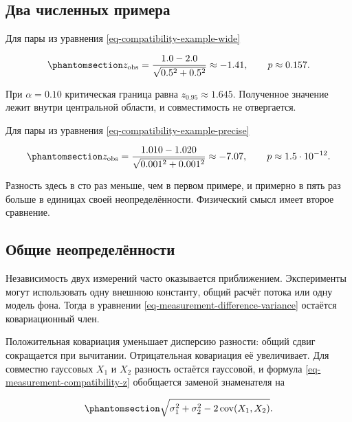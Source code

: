 \documentclass[
  russian,
  11pt,
  a4paper,
  open=any]{scrbook}
\begin{document}
\subsection{Два численных
примера}\label{ux434ux432ux430-ux447ux438ux441ux43bux435ux43dux43dux44bux445-ux43fux440ux438ux43cux435ux440ux430}

Для пары из уравнения \ref{eq-compatibility-example-wide}

\begin{equation}\protect\phantomsection\label{eq-compatibility-example-wide-result}{
z_{\mathrm{obs}}
=\frac{1.0-2.0}{\sqrt{0.5^2+0.5^2}}
\approx-1.41,
\qquad
p\approx0.157.
}\end{equation}

При \(\alpha=0.10\) критическая граница равна \(z_{0.95}\approx1.645\).
Полученное значение лежит внутри центральной области, и совместимость не
отвергается.

Для пары из уравнения \ref{eq-compatibility-example-precise}

\begin{equation}\protect\phantomsection\label{eq-compatibility-example-precise-result}{
z_{\mathrm{obs}}
=\frac{1.010-1.020}{\sqrt{0.001^2+0.001^2}}
\approx-7.07,
\qquad
p\approx1.5\cdot10^{-12}.
}\end{equation}

Разность здесь в сто раз меньше, чем в первом примере, и примерно в пять
раз больше в единицах своей неопределённости. Физический смысл имеет
второе сравнение.

\subsection{Общие
неопределённости}\label{ux43eux431ux449ux438ux435-ux43dux435ux43eux43fux440ux435ux434ux435ux43bux451ux43dux43dux43eux441ux442ux438}

Независимость двух измерений часто оказывается приближением.
Эксперименты могут использовать одну внешнюю константу, общий расчёт
потока или одну модель фона. Тогда в уравнении
\ref{eq-measurement-difference-variance} остаётся ковариационный член.

Положительная ковариация уменьшает дисперсию разности: общий сдвиг
сокращается при вычитании. Отрицательная ковариация её увеличивает. Для
совместно гауссовых \(X_1\) и \(X_2\) разность остаётся гауссовой, и
формула \ref{eq-measurement-compatibility-z} обобщается заменой
знаменателя на

\begin{equation}\protect\phantomsection\label{eq-correlated-measurement-compatibility-denominator}{
\sqrt{
\sigma_1^2+\sigma_2^2
-2\operatorname{cov}(X_1,X_2)
}.
}\end{equation}
\end{document}
